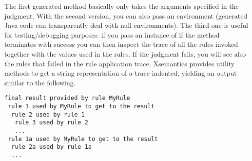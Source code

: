 The first generated method basically only takes the arguments specified in the
judgment.  With the second version, you can also pass an environment
(generated Java code can transparently deal with null environments).
The third one is useful for testing/debugging purposes: if you pass
an instance of  if the
method terminates with success you can then inspect the trace of all the rules
invoked together with the values used in the rules.  If the judgment fails,
you will see also the rules that failed in the rule application trace.
Xsemantics provides utility methods to get a string representation of a trace
indented, yielding an output similar to the following.

\begin{footnotesize}
\begin{verbatim}
final result provided by rule MyRule
 rule 1 used by MyRule to get to the result
  rule 2 used by rule 1
   rule 3 used by rule 2
   ...
 rule 1a used by MyRule to get to the result
  rule 2a used by rule 1a
  ...
\end{verbatim}
\end{footnotesize}
